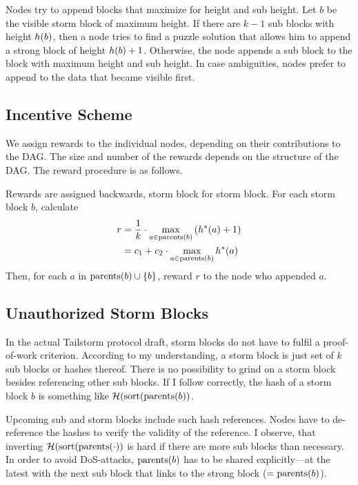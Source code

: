 Nodes try to append blocks that maximize for height and sub height.
Let $b$ be the visible storm block of maximum height.
If there are $k-1$ sub blocks with height $h(b)$, then a node tries to find a puzzle solution that allows him to append a strong block of height $h(b) + 1$.
Otherwise, the node appends a sub block to the block with maximum height and sub height.
In case ambiguities, nodes prefer to append to the data that became visible first.

\subsection{Incentive Scheme}

We assign rewards to the individual nodes, depending on their contributions to the DAG.
The size and number of the rewards depends on the structure of the DAG.
The reward procedure is as follows.

Rewards are assigned backwards, storm block for storm block.
For each storm block $b$, calculate
\begin{align}
  r &= \frac1k \cdot \max_{a \in \operatorname{parents}(b)}\left(h^*(a) + 1\right) \\
    &= c_1 + c_2 \cdot \max_{a \in \operatorname{parents}(b)}h^*(a)
\end{align}
Then, for each $a$ in $\operatorname{parents}(b) \cup \{b\}$, reward $r$ to the node who appended $a$.

\subsection{Unauthorized Storm Blocks}

In the actual Tailstorm protocol draft, storm blocks do not have to fulfil a proof-of-work criterion.
According to my understanding, a storm block is just set of $k$ sub blocks or hashes thereof.
There is no possibility to grind on a storm block besides referencing other sub blocks.
If I follow correctly, the hash of a storm block $b$ is something like $\mathcal{H}(\operatorname{sort}(\operatorname{parents}(b))$.

Upcoming sub and storm blocks include such hash references.
Nodes have to de-reference the hashes to verify the validity of the reference.
I observe, that inverting $\mathcal{H}(\operatorname{sort}(\operatorname{parents}(\cdot))$ is hard if there are more sub blocks than necessary.
In order to avoid DoS-attacks, $\operatorname{parents}(b)$ has to be shared explicitly---at the latest with the next sub block that links to the strong block ($=\operatorname{parents}(b)$).

